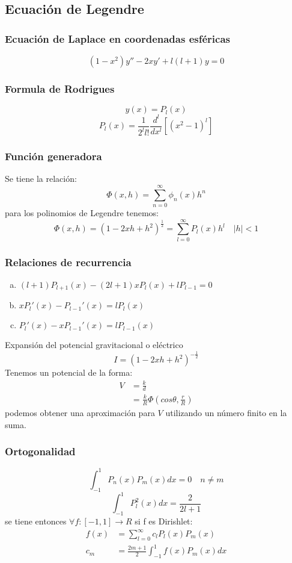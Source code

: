 \documentclass{article}
\begin{document}
\subsection*{Ecuación de Legendre}
\subsubsection*{Ecuación de Laplace en coordenadas esféricas}
\[ (1-x^2)y'' -2xy' + l(l+1)y = 0 \]
\subsubsection*{Formula de Rodrigues}
\[y(x) = P_l(x)\]
\[P_l(x) = \frac{1}{2^ll!}\frac{d^l}{dx^l}[(x^2-1)^l] \]
\subsubsection*{Función generadora}
Se tiene la relación:
\[ \Phi(x,h) = \sum_{n=0}^\infty \phi_n(x)h^n \]
para los polinomios de Legendre tenemos:
\[ \Phi(x,h) = (1-2xh+h^2)^{\frac{1}{2}} = \sum_{l=0}^\infty P_l(x)h^l \quad |h|<1 \]
\subsubsection*{Relaciones de recurrencia}
\begin{enumerate}[a)]
    \item $(l+1)P_{l+1}(x)-(2l+1)xP_l(x)+lP_{l-1} = 0$
    \item $xP_l'(x) - P_{l-1}'(x) = lP_l(x)$
    \item $P_l'(x) - xP_{l-1}'(x) = lP_{l-1}(x)$  
\end{enumerate}
\begin{tcolorbox}
    Expansión del potencial gravitacional o eléctrico
    \[ I = (1-2xh+h^2)^{-\frac{1}{2}} \]
    Tenemos un potencial de la forma:
    \begin{align*}
        V 
        &= \frac{k}{d} \\
        &= \frac{k}{R}\Phi\left(cos\theta, \frac{r}{R}\right)
    \end{align*}
    podemos obtener una aproximación para $V$ utilizando un número finito en la suma.
\end{tcolorbox}
\subsubsection*{Ortogonalidad}
\[ \int_{-1}^1 P_n(x)P_m(x) dx= 0 \quad n\neq m \]
\[ \int_{-1}^1 P_{l}^2(x) dx = \frac{2}{2l+1} \]
se tiene entonces $\forall f:[-1,1] \to R$ si f es Dirishlet:
\begin{align*}
    f(x) &= \sum_{l=0}^\infty c_lP_l(x)P_m(x) \\
    c_m &= \frac{2m+1}{2}\int_{-1}^1 f(x)P_m(x)dx
\end{align*}
\end{document}
